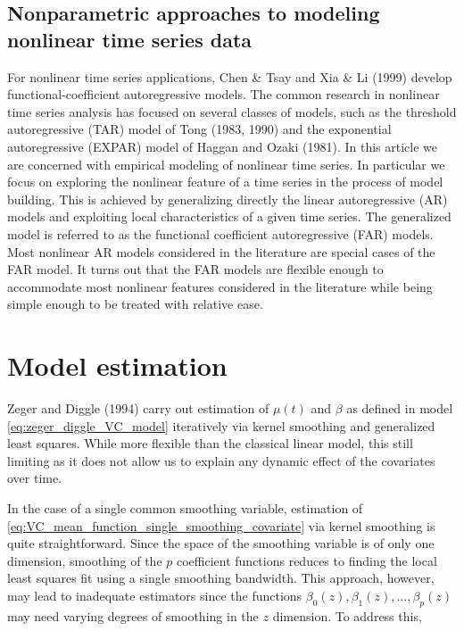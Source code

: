 \documentclass[12pt]{article}
\newcommand*\needsparaphrased{\color{red}}
\begin{document}
\subsection{Nonparametric approaches to modeling nonlinear time series data}


For nonlinear time series applications, Chen \& Tsay \cite{chen1993functional} and Xia \& Li (1999) develop functional-coefficient autoregressive models. The common research in nonlinear time series analysis has focused on several classes of models, such as the threshold autoregressive (TAR) model of Tong (1983, 1990) and the exponential autoregressive (EXPAR) model of Haggan and Ozaki (1981). {\needsparaphrased In this article we are concerned with empirical modeling of nonlinear time series. In particular we focus on exploring the nonlinear feature of a time series in the process of model building. This is achieved by generalizing directly the linear autoregressive (AR) models and exploiting local characteristics of a given time series. The generalized model is referred to as the functional coefficient autoregressive (FAR) models. Most nonlinear AR models considered in the literature are special cases of the FAR model. It turns out that the FAR models are flexible enough to accommodate most nonlinear features considered in the literature while being simple enough to be treated with relative ease. }


\section{Model estimation}

Zeger and Diggle (1994) carry out estimation of $\mu\left(t\right)$ and $\beta$ as defined in model \ref{eq:zeger_diggle_VC_model} iteratively via kernel smoothing and generalized least squares. While more flexible than the classical linear model, this still limiting as it does not allow us to explain any dynamic effect of the covariates over time.  


In the case of a single common smoothing variable, estimation of \ref{eq:VC_mean_function_single_smoothing_covariate} via kernel smoothing is quite straightforward. Since the space of the smoothing variable is of only one dimension, smoothing of the $p$ coefficient functions reduces to finding the local least squares fit using a single smoothing bandwidth. This approach, however, may lead to inadequate estimators since the functions $\beta_0\left(z\right), \beta_1\left(z\right), \dots, \beta_p\left(z\right)$ may need varying degrees of smoothing in the $z$ dimension. To address this, 
\end{document}
